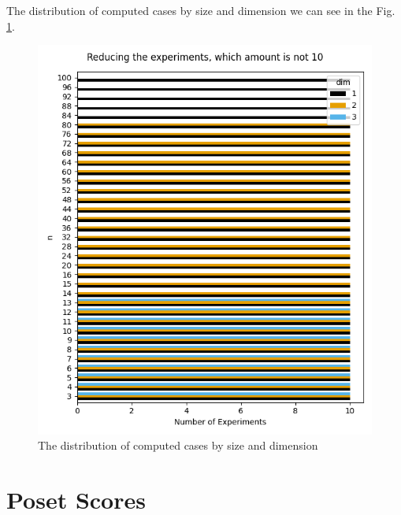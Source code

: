 \documentclass{article}
\begin{document}
\par The distribution of computed cases by size and dimension we can see in the Fig. \ref{fig:cases-distribution}.
\begin{figure}[h!]
    \centering
    \includegraphics[width=1.0\textwidth]{pics/extended torus scores/cases.png}
    \caption{The distribution of computed cases by size and dimension}
    \label{fig:cases-distribution}
\end{figure}

\section{Poset Scores}
\end{document}

